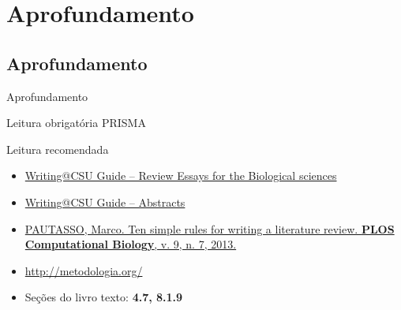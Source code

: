 \documentclass{beamer}
\begin{document}
\section{Aprofundamento}

\subsection{Aprofundamento}

\begin{frame}{Aprofundamento}
  \begin{block}{Leitura obrigatória}
    PRISMA
  \end{block}
  \begin{block}{Leitura recomendada}
    \begin{itemize}
      \tiny
    \item
      \href{https://writing.colostate.edu/guides/guide.cfm?guideid=79}{Writing@CSU Guide -- Review Essays for the Biological sciences}
    \item \href{https://writing.colostate.edu/guides/guide.cfm?guideid=59}{Writing@CSU Guide -- Abstracts}
    \item \href{https://doi.org/10.1371/journal.pcbi.1003149}
      {PAUTASSO, Marco. Ten simple rules for writing a literature review. {\bf PLOS Computational Biology}, v. 9, n. 7, 2013.}
    \item \url{http://metodologia.org/}
    \item Seções do livro texto: {\bf 4.7, 8.1.9}
    \end{itemize}
  \end{block}
\end{frame}
\end{document}
